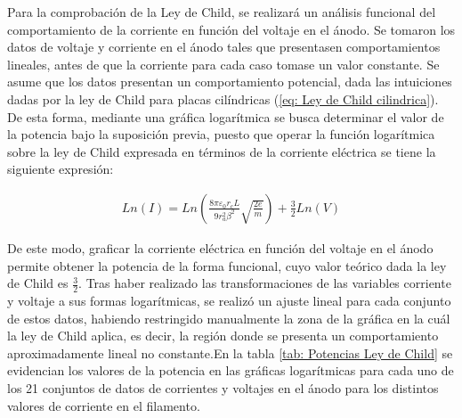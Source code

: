 \documentclass[%
 reprint,
 amsmath,amssymb,
 aps,
]{revtex4-2}
\begin{document}
Para la comprobación de la Ley de Child, se realizará un análisis funcional del comportamiento de la corriente en función del voltaje en el ánodo. Se tomaron los datos de voltaje y corriente en el ánodo tales que presentasen comportamientos lineales, antes de que la corriente para cada caso tomase un valor constante. Se asume que los datos presentan un comportamiento potencial, dada las intuiciones dadas por la ley de Child para placas cilíndricas (\ref{eq: Ley de Child cilindrica}). De esta forma, mediante una gráfica logarítmica se busca determinar el valor de la potencia bajo la suposición previa, puesto que operar la función logarítmica sobre la ley de Child expresada en términos de la corriente eléctrica se tiene la siguiente expresión:

\begin{align*}
    Ln(I) = Ln\left(\frac{8\pi \varepsilon_{0}r_{c}L}{9r_{a}^{2}\beta^{2}} \sqrt{\frac{2e}{m}}\right) + \frac{3}{2}Ln(V)
\end{align*}

\vspace{0.2 cm}
De este modo, graficar la corriente eléctrica en función del voltaje en el ánodo permite obtener la potencia de la forma funcional, cuyo valor teórico dada la ley de Child es $\frac{3}{2}$. Tras haber realizado las transformaciones de las variables corriente y voltaje a sus formas logarítmicas, se realizó un ajuste lineal para cada conjunto de estos datos, habiendo restringido manualmente la zona de la gráfica en la cuál la ley de Child aplica, es decir, la región donde se presenta un comportamiento aproximadamente lineal no constante.En la tabla \ref{tab: Potencias Ley de Child} se evidencian los valores de la potencia en las gráficas logarítmicas para cada uno de los 21 conjuntos de datos de corrientes y voltajes en el ánodo para los distintos valores de corriente en el filamento.
\end{document}
